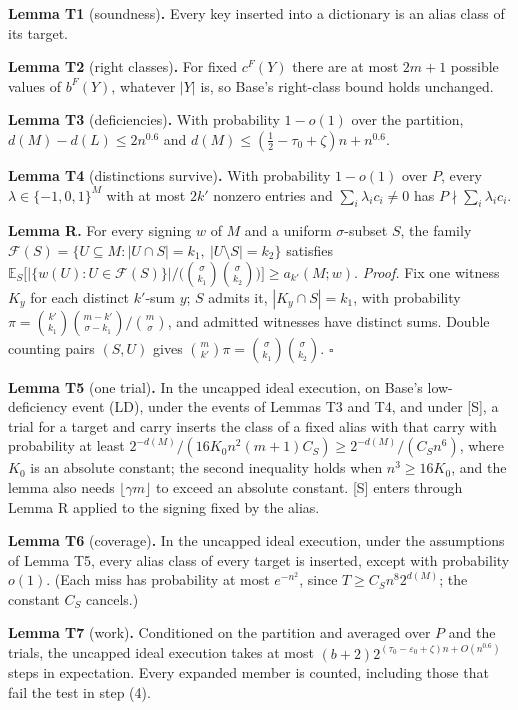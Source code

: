 \documentclass[11pt]{article}
\newcommand{\E}{\mathbb{E}}
\newcommand{\eps}{\varepsilon}
\theoremstyle{plain}
\begin{document}
\textbf{Lemma T1} (soundness)\textbf{.} Every key inserted into a dictionary is an alias class of its target.

\textbf{Lemma T2} (right classes)\textbf{.} For fixed $c^F(Y)$ there are at most $2m+1$ possible values of $b^F(Y)$, whatever $|Y|$ is, so Base's right-class bound holds unchanged.

\textbf{Lemma T3} (deficiencies)\textbf{.} With probability $1 - o(1)$ over the partition, $d(M) - d(L) \le 2n^{0.6}$ and $d(M) \le (\tfrac12 - \tau_0 + \zeta)n + n^{0.6}$.

\textbf{Lemma T4} (distinctions survive)\textbf{.} With probability $1 - o(1)$ over $P$, every $\lambda \in \{-1,0,1\}^M$ with at most $2k'$ nonzero entries and $\sum_i \lambda_i c_i \ne 0$ has $P \nmid \sum_i \lambda_i c_i$.

\textbf{Lemma R.} For every signing $w$ of $M$ and a uniform $\sigma$-subset $S$, the family $\mathcal F(S) = \{U \subseteq M : |U \cap S| = k_1,\ |U\setminus S| = k_2\}$ satisfies $\E_S\bigl[|\{w(U) : U \in \mathcal F(S)\}|\big/\bigl(\binom{\sigma}{k_1}\binom{\sigma}{k_2}\bigr)\bigr] \ge a_{k'}(M; w)$. \emph{Proof.} Fix one witness $K_y$ for each distinct $k'$-sum $y$; $S$ admits it, $|K_y \cap S| = k_1$, with probability $\pi = \binom{k'}{k_1}\binom{m-k'}{\sigma - k_1}/\binom{m}{\sigma}$, and admitted witnesses have distinct sums. Double counting pairs $(S, U)$ gives $\binom{m}{k'}\pi = \binom{\sigma}{k_1}\binom{\sigma}{k_2}$. $\square$

\textbf{Lemma T5} (one trial)\textbf{.} In the uncapped ideal execution, on Base's low-deficiency event (LD), under the events of Lemmas T3 and T4, and under [S], a trial for a target and carry inserts the class of a fixed alias with that carry with probability at least $2^{-d(M)}/(16K_0 n^2 (m+1) C_S) \ge 2^{-d(M)}/(C_S n^6)$, where $K_0$ is an absolute constant; the second inequality holds when $n^3 \ge 16K_0$, and the lemma also needs $\lfloor \gamma m\rfloor$ to exceed an absolute constant. [S] enters through Lemma R applied to the signing fixed by the alias.

\textbf{Lemma T6} (coverage)\textbf{.} In the uncapped ideal execution, under the assumptions of Lemma T5, every alias class of every target is inserted, except with probability $o(1)$. (Each miss has probability at most $e^{-n^2}$, since $T \ge C_S n^8 2^{d(M)}$; the constant $C_S$ cancels.)

\textbf{Lemma T7} (work)\textbf{.} Conditioned on the partition and averaged over $P$ and the trials, the uncapped ideal execution takes at most $(b+2)2^{(\tau_0 - \eps_0 + \zeta)n + O(n^{0.6})}$ steps in expectation. Every expanded member is counted, including those that fail the test in step (4).
\end{document}
